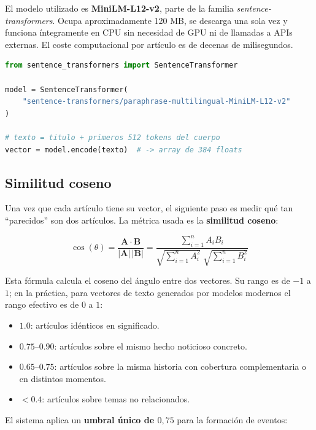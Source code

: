 \documentclass[12pt,a4paper]{article}
\begin{document}
El modelo utilizado es \textbf{MiniLM-L12-v2}, parte de la familia \textit{sentence-transformers}. Ocupa aproximadamente 120 MB, se descarga una sola vez y funciona íntegramente en CPU sin necesidad de GPU ni de llamadas a APIs externas. El coste computacional por artículo es de decenas de milisegundos.

\begin{lstlisting}[language=Python, caption=Generación de embeddings con sentence-transformers]
from sentence_transformers import SentenceTransformer

model = SentenceTransformer(
    "sentence-transformers/paraphrase-multilingual-MiniLM-L12-v2"
)

# texto = titulo + primeros 512 tokens del cuerpo
vector = model.encode(texto)  # -> array de 384 floats
\end{lstlisting}

\subsection{Similitud coseno}

Una vez que cada artículo tiene su vector, el siguiente paso es medir qué tan ``parecidos'' son dos artículos. La métrica usada es la \textbf{similitud coseno}:

\begin{equation}
  \cos(\theta) = \frac{\mathbf{A} \cdot \mathbf{B}}{|\mathbf{A}|\,|\mathbf{B}|} = \frac{\sum_{i=1}^{n} A_i B_i}{\sqrt{\sum_{i=1}^{n} A_i^2}\;\sqrt{\sum_{i=1}^{n} B_i^2}}
\end{equation}

Esta fórmula calcula el coseno del ángulo entre dos vectores. Su rango es de $-1$ a $1$; en la práctica, para vectores de texto generados por modelos modernos el rango efectivo es de $0$ a $1$:

\begin{itemize}[nosep]
  \item $1.0$: artículos idénticos en significado.
  \item $0.75$--$0.90$: artículos sobre el mismo hecho noticioso concreto.
  \item $0.65$--$0.75$: artículos sobre la misma historia con cobertura complementaria o en distintos momentos.
  \item $< 0.4$: artículos sobre temas no relacionados.
\end{itemize}

El sistema aplica un \textbf{umbral único de $0{,}75$} para la formación de eventos:
\end{document}
